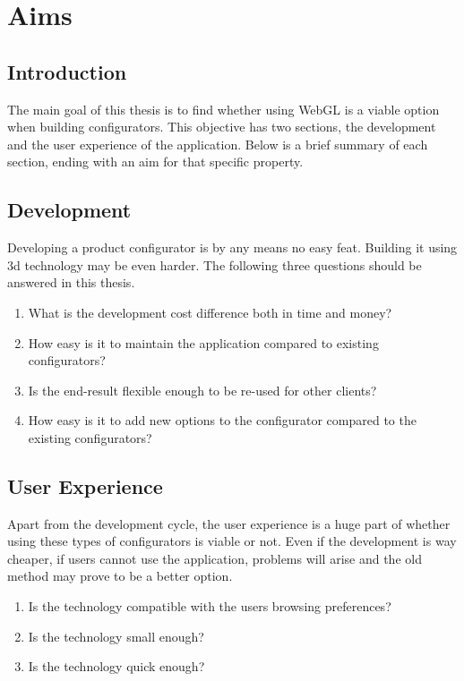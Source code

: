\chapter{Aims}
\section{Introduction}
The main goal of this thesis is to find whether using WebGL is a viable option when building configurators. This objective has two sections, the development and the user experience of the application. Below is a brief summary of each section, ending with an aim for that specific property.
\section{Development}
Developing a product configurator is by any means no easy feat. Building it using 3d technology may be even harder. The following three questions should be answered in this thesis.
​\begin{enumerate}
\item What is the development cost difference both in time and money?
\item How easy is it to maintain the application compared to existing configurators?
\item Is the end-result flexible enough to be re-used for other clients?
\item How easy is it to add new options to the configurator compared to the existing configurators?
\end{enumerate}

\section{User Experience}
Apart from the development cycle, the user experience is a huge part of whether using these types of configurators is viable or not. Even if the development is way cheaper, if users cannot use the application, problems will arise and the old method may prove to be a better option.\begin{enumerate}
\item Is the technology compatible with the users browsing preferences?
\item Is the technology small enough?
\item Is the technology quick enough?
\end{enumerate}